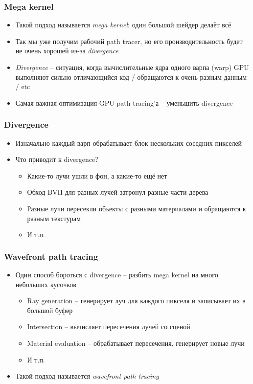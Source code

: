 \documentclass[10pt]{beamer}
\begin{document}
\begin{frame}[fragile]
\frametitle{Mega kernel}
\begin{itemize}
\item Такой подход называется \textit{mega kernel}: один большой шейдер делаёт всё
\pause
\item Так мы уже получим рабочий path tracer, но его производительность будет не очень хорошей из-за \textit{divergence}
\pause
\item \textit{Divergence} -- ситуация, когда вычислительные ядра одного варпа (warp) GPU выполняют сильно отличающийся код / обращаются к очень разным данным / etc
\pause
\item Самая важная оптимизация GPU path tracing'а -- уменьшить divergence
\end{itemize}
\end{frame}

\begin{frame}[fragile]
\frametitle{Divergence}
\begin{itemize}
\item Изначально каждый варп обрабатывает блок нескольких соседних пикселей
\pause
\item Что приводит к divergence?
\pause
\begin{itemize}
\item Какие-то лучи ушли в фон, а какие-то ещё нет
\pause
\item Обход BVH для разных лучей затронул разные части дерева
\pause
\item Разные лучи пересекли объекты с разными материалами и обращаются к разным текстурам
\pause
\item И т.п.
\end{itemize}
\end{itemize}
\end{frame}

\begin{frame}[fragile]
\frametitle{Wavefront path tracing}
\begin{itemize}
\item Один способ бороться с divergence -- разбить mega kernel на много небольших кусочков
\pause
\begin{itemize}
\item Ray generation -- генерирует луч для каждого пикселя и записывает их в большой буфер
\pause
\item Intersection -- вычисляет пересечения лучей со сценой
\pause
\item Material evaluation -- обрабатывает пересечения, генерирует новые лучи
\pause
\item И т.п.
\end{itemize}
\pause
\item Такой подход называется \textit{wavefront path tracing}
\end{itemize}
\end{frame}
\end{document}
